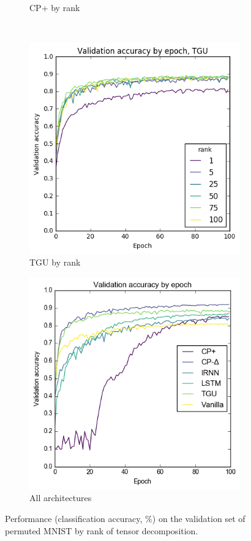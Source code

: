 \begin{figure}[ht]
\begin{subfigure}[t]{0.45\textwidth}
	\caption{CP+ by rank}
	\label{fig:cp+rank}
\end{subfigure}\\
\begin{subfigure}[t]{0.45\textwidth}
	\includegraphics[width=\textwidth]{exps/mnist/tgurank}
	\caption{TGU by rank}
\end{subfigure}\hfill
\begin{subfigure}[t]{0.45\textwidth}
	\includegraphics[width=\textwidth]{exps/mnist/allarchs}
	\caption{All architectures}
\end{subfigure}

\caption[Permuted MNIST results]{Performance (classification accuracy, \%)
 on the validation set of permuted MNIST
by rank of tensor decomposition.}
\label{fig:pmnist}
\end{figure}


